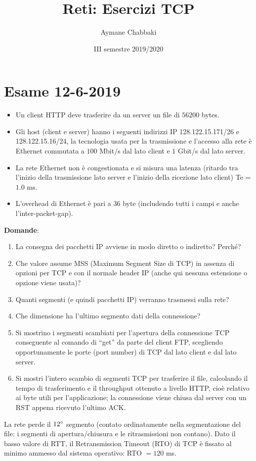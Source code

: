 \documentclass[10pt,a4paper]{article}
\title{Reti: Esercizi TCP}
\author{Aymane Chabbaki}
\date{III semestre 2019/2020}
\begin{document}
	\maketitle
	\tableofcontents
	\newpage

	\section{Esame 12-6-2019}
	\begin{itemize}
		\item Un client HTTP deve trasferire da un server un file di $56200$ bytes. 
		\item Gli host (client e server) hanno i seguenti indirizzi IP 128.122.15.171/26 e 128.122.15.16/24, la tecnologia usata per la trasmissione e l'accesso alla rete è Ethernet commutata a $100$ Mbit/s dal lato client e $1$ Gbit/s dal lato server. 
		\item La rete Ethernet non è congestionata e si misura una latenza (ritardo tra l'inizio della trasmissione lato server e l'inizio della ricezione lato client) Te = $1.0$ ms. 
		\item L'overhead di Ethernet è pari a $36$ byte (includendo tutti i campi e anche l'inter-packet-gap).
	\end{itemize}
	\textbf{Domande}:
	\begin{enumerate}
		\item La consegna dei pacchetti IP avviene in modo diretto o indiretto? Perché?
		\item Che valore assume MSS (Maximum Segment Size di TCP) in assenza di opzioni per TCP e con il normale header IP (anche qui nessuna estensione o opzione viene usata)?
		\item Quanti segmenti (e quindi pacchetti IP) verranno trasmessi sulla rete?
		\item Che dimensione ha l'ultimo segmento dati della connessione?
		\item Si mostrino i segmenti scambiati per l'apertura della connessione TCP conseguente al comando di “get” da parte del client FTP, scegliendo opportunamente le porte (port number) di TCP dal lato client e dal lato server.
		\item Si mostri l'intero scambio di segmenti TCP per trasferire il file, calcolando il tempo di trasferimento e il throughput ottenuto a livello HTTP, cioè relativo ai byte utili per l'applicazione; la connessione viene chiusa dal server con un RST appena ricevuto l'ultimo ACK.
	\end{enumerate}
	La rete perde il $12 \degree$ segmento (contato ordinatamente nella segmentazione del file: i segmenti di apertura/chiusura e le ritrasmissioni non contano). Dato il basso valore di RTT, il Retransmission Timeout (RTO) di TCP è fissato al minimo ammesso dal sistema operativo: RTO $=120$ ms.
\end{document}
